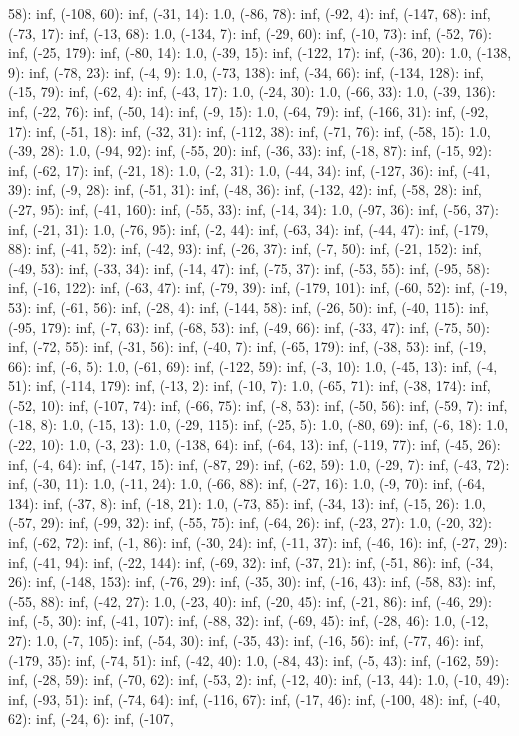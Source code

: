\documentclass[parskip=half]{scrartcl}
\begin{document}
58): inf, (-108, 60): inf, (-31, 14): 1.0, (-86, 78): inf, (-92, 4): inf, (-147, 68): inf, (-73, 17): inf, (-13, 68): 1.0, (-134, 7): inf, (-29, 60): inf, (-10, 73): inf, (-52, 76): inf, (-25, 179): inf, (-80, 14): 1.0, (-39, 15): inf, (-122, 17): inf, (-36, 20): 1.0, (-138, 9): inf, (-78, 23): inf, (-4, 9): 1.0, (-73, 138): inf, (-34, 66): inf, (-134, 128): inf, (-15, 79): inf, (-62, 4): inf, (-43, 17): 1.0, (-24, 30): 1.0, (-66, 33): 1.0, (-39, 136): inf, (-22, 76): inf, (-50, 14): inf, (-9, 15): 1.0, (-64, 79): inf, (-166, 31): inf, (-92, 17): inf, (-51, 18): inf, (-32, 31): inf, (-112, 38): inf, (-71, 76): inf, (-58, 15): 1.0, (-39, 28): 1.0, (-94, 92): inf, (-55, 20): inf, (-36, 33): inf, (-18, 87): inf, (-15, 92): inf, (-62, 17): inf, (-21, 18): 1.0, (-2, 31): 1.0, (-44, 34): inf, (-127, 36): inf, (-41, 39): inf, (-9, 28): inf, (-51, 31): inf, (-48, 36): inf, (-132, 42): inf, (-58, 28): inf, (-27, 95): inf, (-41, 160): inf, (-55, 33): inf, (-14, 34): 1.0, (-97, 36): inf, (-56, 37): inf, (-21, 31): 1.0, (-76, 95): inf, (-2, 44): inf, (-63, 34): inf, (-44, 47): inf, (-179, 88): inf, (-41, 52): inf, (-42, 93): inf, (-26, 37): inf, (-7, 50): inf, (-21, 152): inf, (-49, 53): inf, (-33, 34): inf, (-14, 47): inf, (-75, 37): inf, (-53, 55): inf, (-95, 58): inf, (-16, 122): inf, (-63, 47): inf, (-79, 39): inf, (-179, 101): inf, (-60, 52): inf, (-19, 53): inf, (-61, 56): inf, (-28, 4): inf, (-144, 58): inf, (-26, 50): inf, (-40, 115): inf, (-95, 179): inf, (-7, 63): inf, (-68, 53): inf, (-49, 66): inf, (-33, 47): inf, (-75, 50): inf, (-72, 55): inf, (-31, 56): inf, (-40, 7): inf, (-65, 179): inf, (-38, 53): inf, (-19, 66): inf, (-6, 5): 1.0, (-61, 69): inf, (-122, 59): inf, (-3, 10): 1.0, (-45, 13): inf, (-4, 51): inf, (-114, 179): inf, (-13, 2): inf, (-10, 7): 1.0, (-65, 71): inf, (-38, 174): inf, (-52, 10): inf, (-107, 74): inf, (-66, 75): inf, (-8, 53): inf, (-50, 56): inf, (-59, 7): inf, (-18, 8): 1.0, (-15, 13): 1.0, (-29, 115): inf, (-25, 5): 1.0, (-80, 69): inf, (-6, 18): 1.0, (-22, 10): 1.0, (-3, 23): 1.0, (-138, 64): inf, (-64, 13): inf, (-119, 77): inf, (-45, 26): inf, (-4, 64): inf, (-147, 15): inf, (-87, 29): inf, (-62, 59): 1.0, (-29, 7): inf, (-43, 72): inf, (-30, 11): 1.0, (-11, 24): 1.0, (-66, 88): inf, (-27, 16): 1.0, (-9, 70): inf, (-64, 134): inf, (-37, 8): inf, (-18, 21): 1.0, (-73, 85): inf, (-34, 13): inf, (-15, 26): 1.0, (-57, 29): inf, (-99, 32): inf, (-55, 75): inf, (-64, 26): inf, (-23, 27): 1.0, (-20, 32): inf, (-62, 72): inf, (-1, 86): inf, (-30, 24): inf, (-11, 37): inf, (-46, 16): inf, (-27, 29): inf, (-41, 94): inf, (-22, 144): inf, (-69, 32): inf, (-37, 21): inf, (-51, 86): inf, (-34, 26): inf, (-148, 153): inf, (-76, 29): inf, (-35, 30): inf, (-16, 43): inf, (-58, 83): inf, (-55, 88): inf, (-42, 27): 1.0, (-23, 40): inf, (-20, 45): inf, (-21, 86): inf, (-46, 29): inf, (-5, 30): inf, (-41, 107): inf, (-88, 32): inf, (-69, 45): inf, (-28, 46): 1.0, (-12, 27): 1.0, (-7, 105): inf, (-54, 30): inf, (-35, 43): inf, (-16, 56): inf, (-77, 46): inf, (-179, 35): inf, (-74, 51): inf, (-42, 40): 1.0, (-84, 43): inf, (-5, 43): inf, (-162, 59): inf, (-28, 59): inf, (-70, 62): inf, (-53, 2): inf, (-12, 40): inf, (-13, 44): 1.0, (-10, 49): inf, (-93, 51): inf, (-74, 64): inf, (-116, 67): inf, (-17, 46): inf, (-100, 48): inf, (-40, 62): inf, (-24, 6): inf, (-107, 
\end{document}
